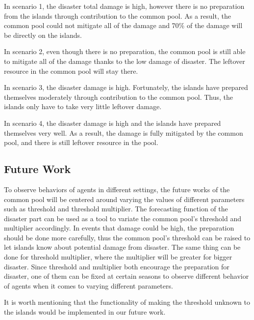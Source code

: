 In scenario 1, the disaster total damage is high, however there is no preparation from the islands through contribution to the common pool. As a result, the common pool could not mitigate all of the damage and 70\% of the damage will be directly on the islands.

In scenario 2, even though there is no preparation, the common pool is still able to mitigate all of the damage thanks to the low damage of disaster. The leftover resource in the common pool will stay there.

In scenario 3, the disaster damage is high. Fortunately, the islands have prepared themselves moderately through contribution to the common pool. Thus, the islands only have to take very little leftover damage.

In scenario 4, the disaster damage is high and the islands have prepared themselves very well. As a result, the damage is fully mitigated by the common pool, and there is still leftover resource in the pool. 


\subsection{Future Work}

To observe behaviors of agents in different settings, the future works of the common pool will be centered around varying the values of different parameters such as threshold and threshold multiplier. The forecasting function of the disaster part can be used as a tool to variate the common pool’s threshold and multiplier accordingly. In events that damage could be high, the preparation should be done more carefully, thus the common pool’s threshold can be raised to let islands know about potential damage from disaster. The same thing can be done for threshold multiplier, where the multiplier will be greater for bigger disaster. Since threshold and multiplier both encourage the preparation for disaster, one of them can be fixed at certain seasons to observe different behavior of agents when it comes to varying different parameters. 

It is worth mentioning that the functionality of making the threshold unknown to the islands would be implemented in our future work.